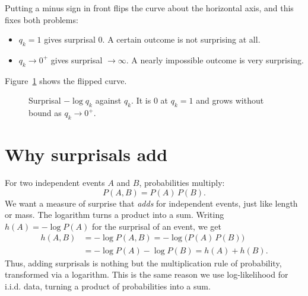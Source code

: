 \documentclass[12pt,a4paper]{article}
\begin{document}
Putting a minus sign in front flips the curve
about the horizontal axis, and this fixes both
problems:
\begin{itemize}
  \item $q_k = 1$ gives surprisal $0$. A certain
        outcome is not surprising at all.
  \item $q_k \to 0^{+}$ gives surprisal
        $\to \infty$. A nearly impossible outcome
        is very surprising.
\end{itemize}

\newpage

Figure~\ref{fig:surprisal} shows the flipped curve.

\begin{figure}[ht]
  \centering
  \caption{Surprisal $-\log q_k$ against $q_k$.
  It is $0$ at $q_k = 1$ and grows without bound
  as $q_k \to 0^{+}$.}
  \label{fig:surprisal}
\end{figure}

\section{Why surprisals add}

For two independent events $A$ and $B$,
probabilities multiply:
\begin{equation}
  P(A, B) = P(A)\,P(B).
  \label{eq:indep}
\end{equation}
We want a measure of surprise that \emph{adds}
for independent events, just like length or mass.
The logarithm turns a product into a sum.
Writing $h(A) = -\log P(A)$ for the surprisal
of an event, we get
\begin{equation}
  \begin{aligned}
    h(A, B) &= -\log P(A, B) = -\log\big(P(A)\,P(B)\big) \\
            &= -\log P(A) - \log P(B) = h(A) + h(B).
  \end{aligned}
  \label{eq:add}
\end{equation}
Thus, adding surprisals is nothing but the
multiplication rule of probability, transformed
via a logarithm. This is the same reason we
use log-likelihood for i.i.d. data, turning
a product of probabilities
into a sum.
\end{document}
